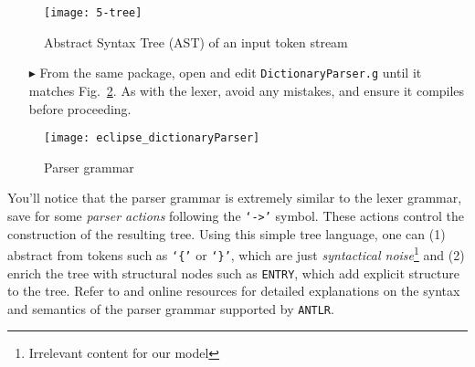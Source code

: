 \vspace{0.5cm}

\begin{figure}[htp]
\begin{center}
 \texttt{[image: 5-tree]}
  \caption{Abstract Syntax Tree (AST) of an input token stream}
  \label{fig:dictLexer}
\end{center}
\end{figure}

\begin{itemize}

\item[$\blacktriangleright$] From the same package, open and edit \texttt{DictionaryParser.g} until it matches Fig.~\ref{eclipse:dictParser}. As with the lexer,
avoid any mistakes, and ensure it compiles before proceeding.

\end{itemize}

\begin{figure}[!htbp]
\begin{center}
 \texttt{[image: eclipse\_dictionaryParser]}
  \caption{Parser grammar}
  \label{eclipse:dictParser}
\end{center}
\end{figure}

You'll notice that the parser grammar is extremely similar to the lexer grammar, save for some \emph{parser actions} following the \texttt{`->'} symbol. These
actions control the construction of the resulting tree. Using this simple tree language, one can (1) abstract from tokens such as \texttt{`\{'} or
\texttt{`\}'}, which are just \emph{syntactical noise}\footnote{Irrelevant content for our model} and (2) enrich the tree with structural nodes such as
\texttt{ENTRY}, which add explicit structure to the tree. Refer to \cite{ANTLR} and online resources for detailed explanations on the syntax and semantics of
the parser grammar supported by \texttt{ANTLR}.

\newpage

